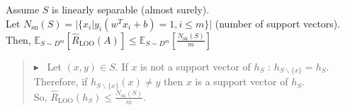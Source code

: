 \documentclass[12pt,a4paper]{article}
\newcommand{\theoreme}[2]{%
    \begin{tcolorbox}[colback=white,colframe=red!25!white,title=\textbf{Théorème #1}, coltitle=black]
        #2
    \end{tcolorbox}
}
\newcommand{\preuve}[1]{%
    \begin{quote}
        $\blacktriangleright$~#1
    \end{quote}
}
\begin{document}
\theoreme{}{
    Assume $S$ is linearly separable (almost surely).\\
    Let $N_{\text{sn}}(S) = |\{x_i | y_i(w^T x_i + b) = 1, i \leq m\}|$ (number of support vectors).\\
    Then, $\mathbb{E}_{S \sim D^m} [\hat{R}_{\text{LOO}}(A)] \leq \mathbb{E}_{S \sim D^m} [\frac{N_{\text{sn}}(S)}{m}]$
}

\preuve{
    Let $(x, y) \in S$. If $x$ is not a support vector of $h_S$ : $h_{S \backslash \{x\}} = h_S$.\\
    Therefore, if $h_{S \backslash \{x\}}(x) \neq y$ then $x$ is a support vector of $h_S$.\\
    So, $\hat{R}_{\text{LOO}}(h_S) \leq \frac{N_{\text{sn}}(S)}{m}$.
}
\end{document}
